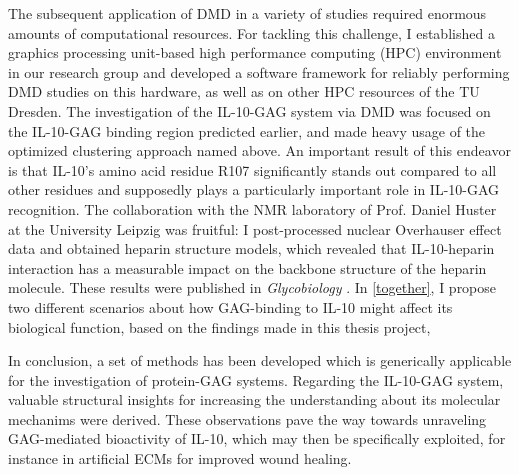 The subsequent application of DMD in a variety of studies required enormous
amounts of computational resources. For tackling this challenge, I established a
graphics processing unit-based high performance computing (HPC) environment in
our research group and developed a software framework for reliably performing
DMD studies on this hardware, as well as on other HPC resources of the TU
Dresden. The investigation of the IL-10-GAG system via DMD was focused on the
IL-10-GAG binding region predicted earlier, and made heavy usage of the
optimized clustering approach named above. An important result of this endeavor
is that IL-10's amino acid residue R107 significantly stands out compared to all
other residues and supposedly plays a particularly important role in IL-10-GAG
recognition. The collaboration with the NMR laboratory of Prof. Daniel Huster at
the University Leipzig was fruitful: I post-processed nuclear Overhauser effect
data and obtained heparin structure models, which revealed that IL-10-heparin
interaction has a measurable impact on the backbone structure of the heparin
molecule. These results were published in \textit{Glycobiology}
\cite{kuenze_gehrcke_2014}. In \cref{together}, I propose two different
scenarios about how GAG-binding to IL-10 might affect its biological function,
based on the findings made in this thesis project,

In conclusion, a set of methods has been developed which is generically
applicable for the investigation of protein-GAG systems. Regarding the IL-10-GAG
system, valuable structural insights for increasing the understanding about its
molecular mechanims were derived. These observations pave the way towards
unraveling GAG-mediated bioactivity of IL-10, which may then be specifically
exploited, for instance in artificial ECMs for improved wound healing.

